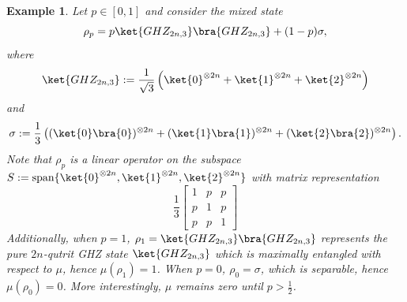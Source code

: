 \documentclass{article}
\newtheorem{eg}{Example}
\begin{document}
\begin{eg}
    Let $p\in [0,1]$ and consider the mixed state 
    \[\rho_p = p\ket{GHZ_{2n,3}}\bra{GHZ_{2n,3}}+(1-p)\sigma,\]
    where
    \[\ket{GHZ_{2n,3}} := \frac{1}{\sqrt{3}}\left(\ket{0}^{\otimes 2n}+\ket{1}^{\otimes 2n}+\ket{2}^{\otimes 2n}\right)\]
    and
    \[\sigma := \frac{1}{3}\left((\ket{0}\bra{0})^{\otimes 2n}+(\ket{1}\bra{1})^{\otimes 2n}+(\ket{2}\bra{2})^{\otimes 2n}\right).\]
    Note that $\rho_p$ is a linear operator on the subspace $S := \mathrm{span}\{\ket{0}^{\otimes 2n},\ket{1}^{\otimes 2n},\ket{2}^{\otimes 2n}\}$ with matrix representation
    \[\frac{1}{3}\left[\begin{array}{ccc}
        1 & p & p \\
        p & 1 & p \\
        p & p & 1
    \end{array}\right]\]
    Additionally, when $p=1$, $\rho_1 = \ket{GHZ_{2n,3}}\bra{GHZ_{2n,3}}$ represents the pure $2n$-qutrit GHZ state $\ket{GHZ_{2n,3}}$ which is maximally entangled with respect to $\mu$, hence $\mu(\rho_1)=1$. When $p=0$, $\rho_0 = \sigma$, which is separable, hence $\mu(\rho_0)=0$. More interestingly, $\mu$ remains zero until $p > \frac{1}{2}$. 
    

\end{eg}
\end{document}
